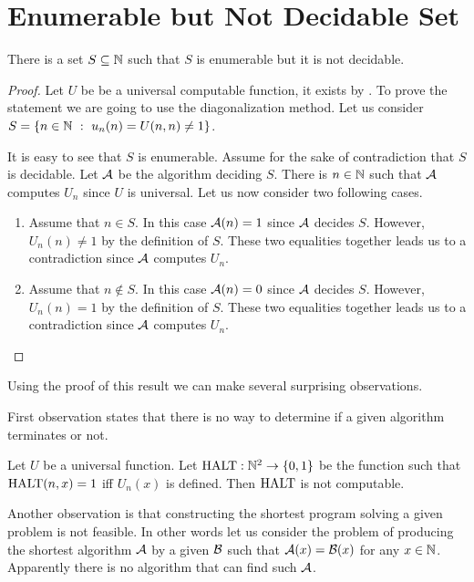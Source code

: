 \section{Enumerable but Not Decidable Set}
\begin{theorem}
\label{theorem:enumerable-not-decidable}
  There is a set $S \subseteq {\mathbb{N}}$ such that $S$ is enumerable but it is not
  decidable.
\end{theorem}
\begin{proof}
  Let $U$ be be a universal computable function, it exists by
  .
  To prove the statement we are going to use the diagonalization method.
  Let us consider $S = \set[u_n(n) = U(n, n) \neq 1]{n \in \N}$.

  It is easy to see that $S$ is enumerable. Assume for the sake of
  contradiction that $S$ is decidable. Let $\mathcal{A}$ be the algorithm
  deciding $S$. There is $n \in {\mathbb{N}}$ such that $\mathcal{A}$ computes $U_n$
  since $U$ is universal. Let us now consider two following cases.
  \begin{enumerate}
    \item Assume that $n \in S$. In this case $\mathcal{A}(n) = 1$ since
      $\mathcal{A}$ decides $S$. However, $U_n(n) \neq 1$ by the definition of
      $S$. These two equalities together leads us to a contradiction since
      $\mathcal{A}$ computes $U_n$.
    \item Assume that $n \notin S$. In this case $\mathcal{A}(n) = 0$ since
      $\mathcal{A}$ decides $S$. However, $U_n(n) = 1$ by the definition of
      $S$. These two equalities together leads us to a contradiction since
      $\mathcal{A}$ computes $U_n$.
  \end{enumerate}
\end{proof}

Using the proof of this result we can make several surprising observations.

First observation states that there is no way to determine if a given
algorithm terminates or not.
\begin{theorem}
  Let $U$ be a universal function.
  Let $\Halting : \N^2 \to \set{0, 1}$ be the function such that
  $\mathrm{HALT}(n, x) = 1$ iff $U_n(x)$ is defined. Then $\mathrm{HALT}$ is not
  computable.
\end{theorem}

Another observation is that constructing the shortest program solving a given
problem is not feasible.
In other words let us consider the problem of producing the shortest algorithm
$\mathcal{A}$ by a given $\mathcal{B}$ such that
$\mathcal{A}(x) = \mathcal{B}(x)$ for any $x \in {\mathbb{N}}$. Apparently there is
no algorithm that can find such $\mathcal{A}$.


